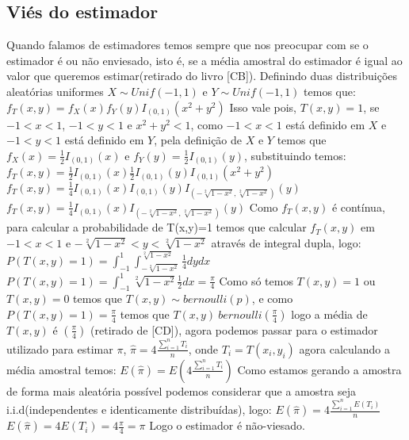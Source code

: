 \documentclass{article}
\begin{document}
\subsection{Viés do estimador}
Quando falamos de estimadores temos sempre que nos preocupar com se o estimador é ou não enviesado, isto é, se a média amostral do estimador é igual ao valor que queremos estimar(retirado do livro [CB]).
\newline
Definindo duas distribuições aleatórias uniformes $X\sim Unif(-1,1)$ e $Y\sim Unif(-1,1)$  temos que:
\newline
$f_T(x,y)=f_X(x)f_Y(y)I_{(0,1)}(x^2+y^2)$
\newline
Isso vale pois, $T(x,y)=1$, se $-1<x<1$, $-1<y<1$ e $x^2+y^2<1$, como $-1<x<1$ está definido em $X$ e $-1<y<1$ está definido em $Y$, pela definição de $X$ e $Y$ temos que $f_X(x)=\frac{1}{2}I_{(0,1)}(x)$ e $f_Y(y)=\frac{1}{2}I_{(0,1)}(y)$, substituindo temos:
\newline
$f_T(x,y)=\frac{1}{2}I_{(0,1)}(x)\frac{1}{2}I_{(0,1)}(y)I_{(0,1)}(x^2+y^2)$
\newline
$f_T(x,y)=\frac{1}{4}I_{(0,1)}(x)I_{(0,1)}(y)I_{(-\sqrt[2]{1-x^2},\sqrt[2]{1-x^2})}(y)$
\newline
$f_T(x,y)=\frac{1}{4}I_{(0,1)}(x)I_{(-\sqrt[2]{1-x^2},\sqrt[2]{1-x^2})}(y)$
\newline
Como $f_T(x,y)$ é contínua, para calcular a probabilidade de T(x,y)=1 temos que calcular $f_T(x,y)$ em $-1<x<1$ e $-\sqrt[2]{1-x^2}<y<\sqrt[2]{1-x^2}$ através de integral dupla, logo:
\newline
$P(T(x,y)=1)=\int_{-1}^{1}\int_{-\sqrt[2]{1-x^2}}^{\sqrt[2]{1-x^2}}\frac{1}{4}dydx$
\newline
$P(T(x,y)=1)=\int_{-1}^{1}\sqrt[2]{1-x^2}\frac{1}{2}dx=\frac{\pi}{4}$
\newline
Como só temos $T(x,y)=1$ ou $T(x,y)=0$ temos que $T(x,y)\sim bernoulli(p)$, e como $P(T(x,y)=1)=\frac{\pi}{4}$ temos que $T(x,y)~bernoulli(\frac{\pi}{4})$ logo a média de $T(x,y)$ é $(\frac{\pi}{4})$ (retirado de [CD]), agora podemos passar para o estimador utilizado para estimar $\pi$, $\hat{\pi}=4\frac{\sum_{i=1}^{n}T_i}{n}$, onde $T_i=T(x_i,y_i)$ agora calculando a média amostral temos:
\newline
$E(\hat{\pi})=E(4\frac{\sum_{i=1}^{n}T_i}{n})$
\newline
Como estamos gerando a amostra de forma mais aleatória possível podemos considerar que a amostra seja i.i.d(independentes e identicamente distribuídas), logo:
\newline
$E(\hat{\pi})=4\frac{\sum_{i=1}^{n}E(T_i)}{n}$
\newline
$E(\hat{\pi})=4E(T_i)=4\frac{\pi}{4}=\pi$
\newline
Logo o estimador é não-viesado.
\end{document}
